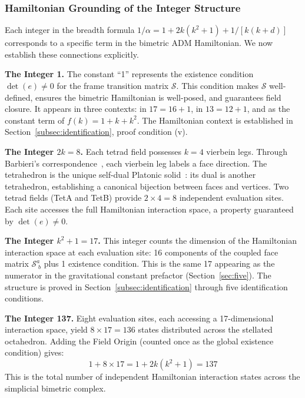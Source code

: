 \documentclass[aps,prd,preprint,superscriptaddress,showpacs,preprintnumbers,amsmath,amssymb,nofootinbib]{revtex4-2}
\begin{document}
\subsubsection*{Hamiltonian Grounding of the Integer Structure}

Each integer in the breadth formula $1/\alpha = 1 + 2k(k^2 + 1) + 1/[k(k+d)]$ corresponds to a specific term in the bimetric ADM Hamiltonian. We now establish these connections explicitly.

\textbf{The Integer 1.}
The constant ``1'' represents the existence condition $\det(e) \neq 0$ for the frame transition matrix $\mathcal{S}$. This condition makes $\mathcal{S}$ well-defined, ensures the bimetric Hamiltonian is well-posed, and guarantees field closure. It appears in three contexts: in $17 = 16 + 1$, in $13 = 12 + 1$, and as the constant term of $f(k) = 1 + k + k^2$. The Hamiltonian context is established in Section~\ref{subsec:identification}, proof condition (v).

\textbf{The Integer $2k = 8$.}
Each tetrad field possesses $k = 4$ vierbein legs. Through Barbieri's correspondence~\cite{barbieri1998}, each vierbein leg labels a face direction. The tetrahedron is the unique self-dual Platonic solid~\cite{coxeter1973}: its dual is another tetrahedron, establishing a canonical bijection between faces and vertices. Two tetrad fields (TetA and TetB) provide $2 \times 4 = 8$ independent evaluation sites. Each site accesses the full Hamiltonian interaction space, a property guaranteed by $\det(e) \neq 0$.

\textbf{The Integer $k^2 + 1 = 17$.}
This integer counts the dimension of the Hamiltonian interaction space at each evaluation site: 16 components of the coupled face matrix $\mathcal{S}^a_{\;b}$ plus 1 existence condition. This is the same 17 appearing as the numerator in the gravitational constant prefactor (Section~\ref{sec:five}). The structure is proved in Section~\ref{subsec:identification} through five identification conditions.

\textbf{The Integer 137.}
Eight evaluation sites, each accessing a 17-dimensional interaction space, yield $8 \times 17 = 136$ states distributed across the stellated octahedron. Adding the Field Origin (counted once as the global existence condition) gives:
\begin{equation}
1 + 8 \times 17 = 1 + 2k(k^2 + 1) = 137
\end{equation}
This is the total number of independent Hamiltonian interaction states across the simplicial bimetric complex.
\end{document}
